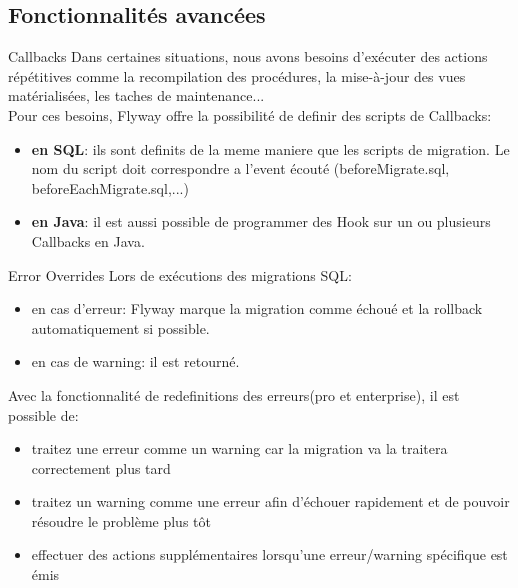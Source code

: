 \documentclass[slidestop,compress,11pt,xcolor=dvipsnames,french]{beamer}
\begin{document}
\subsection*{Fonctionnalités avancées}
\begin{frame}{Callbacks}
Dans certaines situations, nous avons besoins d'exécuter des actions répétitives comme la recompilation des procédures, la mise-à-jour des vues matérialisées, les taches de maintenance... \\
\vspace{1cm}
Pour ces besoins, Flyway offre la possibilité de definir des scripts de Callbacks: \\
 \begin{itemize}
  \item \textbf{en SQL}: ils sont definits de la meme maniere que les scripts de migration. Le nom du script doit correspondre a l'event écouté (beforeMigrate.sql, beforeEachMigrate.sql,...)
  \item \textbf{en Java}: il est aussi possible de programmer des Hook sur un ou plusieurs Callbacks en Java.
 \end{itemize}
\end{frame}

\begin{frame}{Error Overrides}
Lors de exécutions des migrations SQL:
\begin{itemize}
\item en cas d'erreur: Flyway marque la migration comme échoué et la rollback automatiquement si possible.
 \item en cas de warning: il est retourné.
\end{itemize}

\vspace{1cm}

Avec la fonctionnalité de redefinitions des erreurs(pro et enterprise), il est possible de:
\begin{itemize}
 \item traitez une erreur comme un warning car la migration va la traitera correctement plus tard
 \item traitez un warning comme une erreur afin d'échouer rapidement et de pouvoir résoudre le problème plus tôt
 \item effectuer des actions supplémentaires lorsqu'une erreur/warning spécifique est émis 
\end{itemize}
\end{frame}
\end{document}
